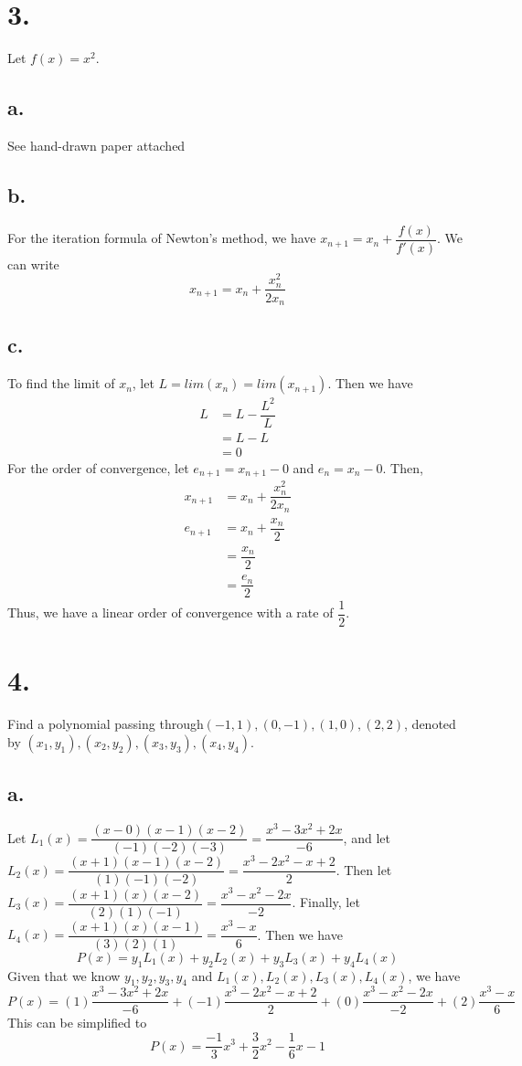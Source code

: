\documentclass{article}
\begin{document}
\section*{3.}
Let $f(x) = x^2$.
\subsection*{a.} See hand-drawn paper attached
\subsection*{b.}
	For the iteration formula of Newton's method, we have $x_{n+1} = x_n + \dfrac{f(x)}{f'(x)}$. We can write \[x_{n+1} = x_n + \dfrac{x_n^2}{2x_n} \]
\subsection*{c.}
To find the limit of $x_n$, let $L = lim(x_n) = lim(x_{n+1})$. Then we have
\begin{align*}
	L & = L - \dfrac{L^2}{L} \\
	& = L - L\\
	&= 0
\end{align*}
For the order of convergence, let $e_{n+1} = x_{n+1} - 0$ and $e_n = x_n - 0$. Then,
 \begin{align*}x_{n+1} & = x_n + \dfrac{x_n^2}{2x_n} \\
e_{n+1} &= x_n + \dfrac{x_n}{2} \\
& =\dfrac{x_n}{2} \\
& = \dfrac{e_n}{2} \end{align*} Thus, we have a linear order of convergence with a rate of $\dfrac{1}{2}$.

\section*{4.} Find a polynomial passing through$(-1,1),(0,-1),(1,0),(2,2)$, denoted by $(x_1,y_1),( x_2,y_2),( x_3,y_3),( x_4,y_4)$. \subsection*{a.} Let $L_1(x) = \dfrac{(x-0)(x-1)(x-2)}{(-1)(-2)(-3)} = \dfrac{x^3-3x^2+2x}{-6}$, and let $L_2(x) = \dfrac{(x+1)(x-1)(x-2)}{(1)(-1)(-2)} = \dfrac{x^3-2x^2 - x+2}{2}$. Then let $L_3(x)=\dfrac{(x+1)(x)(x-2)}{(2)(1)(-1)} = \dfrac{x^3-x^2-2x}{-2}$. Finally, let $L_4(x)=\dfrac{(x+1)(x)(x-1)}{(3)(2)(1)} = \dfrac{x^3-x}{6}$. Then we have \[ P(x) = y_1 L_1(x) + y_2 L_2(x) + y_3 L_3 (x) + y_4 L_4(x)\] Given that we know $y_1, y_2, y_3, y_4$ and $L_1(x), L_2(x), L_3(x), L_4(x)$, we have \[ P(x) = (1) \dfrac{x^3-3x^2+2x}{-6} + (-1) \dfrac{x^3-2x^2 - x+2}{2} + (0) \dfrac{x^3-x^2-2x}{-2} + (2) \dfrac{x^3-x}{6}\] This can be simplified to \[P(x) = \dfrac{-1}{3}x^3+\dfrac{3}{2}x^2-\dfrac{1}{6}x-1\]
\end{document}
